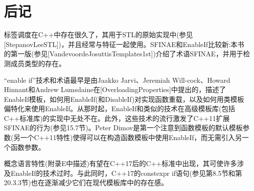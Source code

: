 \section{后记}
标签调度在C++中存在很久了，其用于STL的原始实现中(参见[StepanovLeeSTL])，并且经常与特征一起使用。SFINAE和EnableIf比较新:本书的第一版(参见[VandevoordeJosuttisTemplates1st])介绍了术语SFINAE，并用于检测成员类型的存在。

“enable if”技术和术语最早是由Jaakko Jarvi、Jeremiah Will-cock、Howard Hinnant和Andrew Lumsdaine在[OverloadingProperties]中提出的，描述了EnableIf模板，如何用EnableIf(和DisableIf)对实现函数重载，以及如何用类模板偏特化来使用EnableIf。从那时起，EnableIf和类似的技术在高级模板库(包括C++标准库)的实现中无处不在。此外，这些技术的流行激发了C++11扩展SFINAE的行为(参见15.7节)。Peter Dimov是第一个注意到函数模板的默认模板参数(另一个C++11特性)使得可以在构造函数模板中使用EnableIf，而无需引入另一个函数参数。

概念语言特性(附录E中描述)有望在C++17后的C++标准中出现，其可使许多涉及EnableIf的技术过时。与此同时，C++17的constexpr if语句(参见第8.5节和第20.3.3节)也在逐渐减少它们在现代模板库中的存在感。